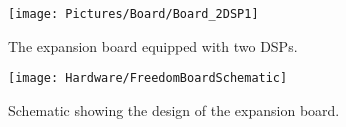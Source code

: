 \begin{figure}[H]
	\centering
	\texttt{[image: Pictures/Board/Board\_2DSP1]}	
	\caption{The expansion board equipped with two DSPs.}
	\label{fig:PCBboard}
\end{figure}


\begin{figure}[H]
	\centering
	\texttt{[image: Hardware/FreedomBoardSchematic]}	
	\caption{Schematic showing the design of the expansion board.}
	\label{fig:PCBboardSchem}
\end{figure}





